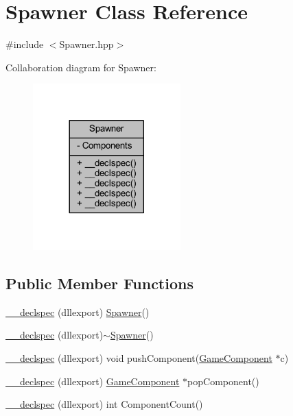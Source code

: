 \hypertarget{class_spawner}{\section{Spawner Class Reference}
\label{class_spawner}
}


{\ttfamily \#include $<$Spawner.\-hpp$>$}



Collaboration diagram for Spawner\-:\nopagebreak
\begin{figure}[H]
\begin{center}
\leavevmode
\includegraphics[width=161pt]{class_spawner__coll__graph}
\end{center}
\end{figure}
\subsection*{Public Member Functions}
\begin{DoxyCompactItemize}
\item 
\hyperlink{class_spawner_a2f9189658debef135e7ef3dae740dc60}{\-\_\-\-\_\-declspec} (dllexport) \hyperlink{class_spawner}{Spawner}()
\item 
\hyperlink{class_spawner_a7d9e09cf1588c58654650279268e02be}{\-\_\-\-\_\-declspec} (dllexport)$\sim$\hyperlink{class_spawner}{Spawner}()
\item 
\hyperlink{class_spawner_a3e3afb5a4121a7c2fa6f38950c88af31}{\-\_\-\-\_\-declspec} (dllexport) void push\-Component(\hyperlink{class_game_component}{Game\-Component} $\ast$c)
\item 
\hyperlink{class_spawner_aaf8e881a3933e8a582d2fe5d81abb9b1}{\-\_\-\-\_\-declspec} (dllexport) \hyperlink{class_game_component}{Game\-Component} $\ast$pop\-Component()
\item 
\hyperlink{class_spawner_a593f6964eae5b1d47bbc82701d2aa0df}{\-\_\-\-\_\-declspec} (dllexport) int Component\-Count()
\end{DoxyCompactItemize}

